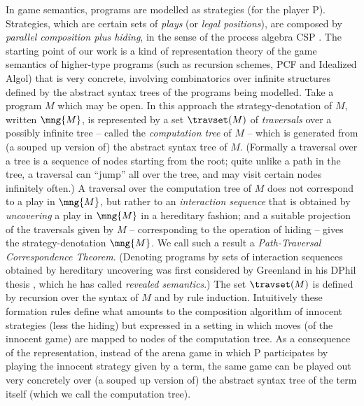 In game semantics, programs are modelled as strategies (for the player P). Strategies, which are certain sets of \emph{plays} (or \emph{legal positions}), are composed by \emph{parallel composition plus hiding}, in the sense of the process algebra CSP \cite{Hoa85}. The starting point of our work is a kind of representation theory of the game semantics of higher-type programs (such as recursion schemes, PCF and Idealized Algol) that is very concrete, involving combinatorics over infinite structures defined by the abstract syntax trees of the programs being modelled. Take a program $M$ which may be open. In this approach the strategy-denotation of $M$, written $\mng{M}$, is represented by a set $\travset(M)$ of \emph{traversals} over a possibly infinite tree -- called the \emph{computation tree} of $M$ -- which is generated from (a souped up version of) the abstract syntax tree of $M$. (Formally a traversal over a tree is a sequence of nodes starting from the root; quite unlike a path in the tree, a traversal can ``jump'' all over the tree, and may visit certain nodes infinitely often.) A traversal over the computation tree of $M$ does not correspond to a play in $\mng{M}$, but rather to an \emph{interaction sequence} that is obtained by \emph{uncovering} \cite{HO00} a play in $\mng{M}$ in a hereditary fashion; and a suitable projection of the traversals given by $M$ -- corresponding to the operation of hiding -- gives the strategy-denotation $\mng{M}$. We call such a result a \emph{Path-Traversal Correspondence Theorem}. (Denoting programs by sets of interaction sequences obtained by hereditary uncovering was first considered by Greenland in his DPhil thesis \cite{Gre05}, which he has called \emph{revealed semantics}.) The set $\travset(M)$ is defined by recursion over the syntax of $M$ and by rule induction.
Intuitively these formation rules define what amounts to the composition algorithm of innocent strategies (less the hiding) but expressed in a setting in which moves (of the innocent game) are mapped to nodes of the computation tree. As a consequence of the representation, instead of the arena game in which P participates by playing the innocent strategy given by a term, the same game can be played out very concretely over (a souped up version of) the abstract syntax tree of the term itself (which we call the computation tree).

